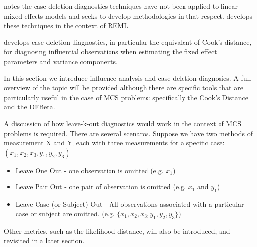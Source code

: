 \documentclass[12pt, a4paper]{report}
\theoremstyle{plain}
\theoremstyle{definition}
\theoremstyle{remark}
\begin{document}
\citet{Christiansen} notes the case deletion diagnostics techniques have not been applied to linear mixed effects models and seeks to develop methodologies in that respect. \citet{Christiansen} develops these techniques in the context of REML

\citet{Christiansen} develops  case deletion diagnostics, in particular the equivalent of  Cook's distance, for diagnosing influential observations when estimating the fixed effect parameters and variance components.

In this section we introduce influence analysis and case deletion diagnosics. A full overview of the topic will be provided although there are specific tools that are particularly useful in the case of MCS problems: specifically the Cook's Distance and the DFBeta.

A discussion of how leave-k-out diagnostics would work in the context of MCS problems is required. There are several scenaros. Suppose we have two methods of measurement X and Y, each with three measurements for a specific case: $(x_1,x_2,x_3,y_1,y_2,y_3)$

\begin{itemize}
	\item Leave One Out - one observation is omitted (e.g. $x_1$)
	\item Leave Pair Out - one pair of observation  is omitted (e.g. $x_1$ and $y_1$)
	\item Leave Case (or Subject) Out - All observations associated with a particular case or subject are omitted. (e.g. $\{x_1,x_2,x_3,y_1,y_2,y_3\}$)
\end{itemize}
Other metrics, such as the likelihood distance, will also be introduced, and revisited in a later section.



%
%
\end{document}
